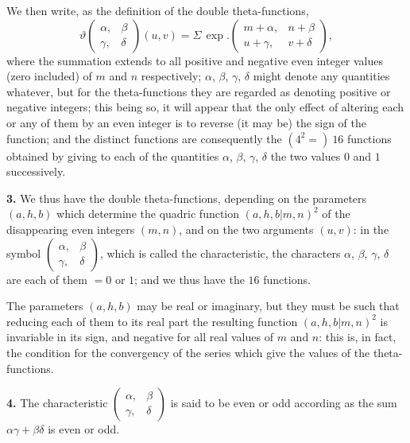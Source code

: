 \documentclass[12pt,a4paper]{article}
\newcommand{\cbtw}{\vert}  %
\theoremstyle{definition}
\begin{document}
We then write, as the definition of the double theta-functions,
\[
\vartheta\begin{pmatrix} \alpha, & \beta \\ \gamma, & \delta \end{pmatrix}(u, v) = \Sigma\, \exp.\begin{pmatrix} m + \alpha, & n + \beta \\ u + \gamma, & v + \delta \end{pmatrix},
\]
where the summation extends to all positive and negative even integer values (zero included) of $m$ and $n$ respectively; $\alpha$, $\beta$, $\gamma$, $\delta$ might denote any quantities whatever, but for the theta-functions they are regarded as denoting positive or negative integers; this being so, it will appear that the only effect of altering each or any of them by an even integer is to reverse (it may be) the sign of the function; and the distinct functions are consequently the $(4^2 =)\ 16$ functions obtained by giving to each of the quantities $\alpha$, $\beta$, $\gamma$, $\delta$ the two values $0$ and $1$ successively.

\noindent\textbf{3.}\quad
We thus have the double theta-functions, depending on the parameters $(a, h, b)$ which determine the quadric function $(a, h, b\cbtw m, n)^2$ of the disappearing even integers $(m, n)$, and on the two arguments $(u, v)$: in the symbol $\begin{pmatrix} \alpha, & \beta \\ \gamma, & \delta \end{pmatrix}$, which is called the characteristic, the characters $\alpha$, $\beta$, $\gamma$, $\delta$ are each of them $= 0$ or $1$; and we thus have the $16$ functions.

The parameters $(a, h, b)$ may be real or imaginary, but they must be such that reducing each of them to its real part the resulting function $(a, h, b\cbtw m, n)^2$ is invariable in its sign, and negative for all real values of $m$ and $n$: this is, in fact, the condition for the convergency of the series which give the values of the theta-functions.

\noindent\textbf{4.}\quad
The characteristic $\begin{pmatrix} \alpha, & \beta \\ \gamma, & \delta \end{pmatrix}$ is said to be even or odd according as the sum $\alpha\gamma + \beta\delta$ is even or odd.

\vspace{1em}
\end{document}
